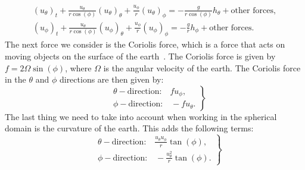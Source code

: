\begin{equation} 
    \begin{aligned}
         {(u_\theta)}_t + \frac{u_\theta}{r \cos(\phi)} {(u_\theta)}_\theta + \frac{u_\phi}{r} {(u_\theta)}_\phi = -\frac{g}{r \cos(\phi)} h_{\theta} + \text{other forces}, \\
        {( u_\phi)}_t + \frac{u_\theta}{r \cos(\phi)} {(u_\phi)}_\theta   + \frac{u_\phi}{r} {(u_\phi)}_\phi = -\frac{g}{r} h_{\phi} + \text{other forces}.
    \end{aligned}
\end{equation}
The next force we consider is the Coriolis force, which is a force that acts on moving objects on the surface of the earth~\cite{Coriolis}.
The Coriolis force is given by $f = 2 \Omega \sin(\phi)$, where $\Omega$ is the angular velocity of the earth.
The Coriolis force in the $\theta$ and $\phi$ directions are then given by:
\begin{equation*}
    \left.
    \begin{aligned}
        &\theta-\text{direction:} \quad f u_\phi,\\
        &\phi-\text{direction:} \quad -f u_\theta.
    \end{aligned}
    \right\}
\end{equation*}
The last thing we need to take into account when working in the spherical domain is the curvature of the earth.
This adds the following terms:
\begin{equation*}
    \left.
    \begin{aligned}
        &\theta-\text{direction:} \quad \frac{u_\theta u_\phi}{r} \tan(\phi),\\
        &\phi-\text{direction:} \quad -\frac{u_\theta^2}{r} \tan(\phi).
    \end{aligned}
    \right\}
\end{equation*}


